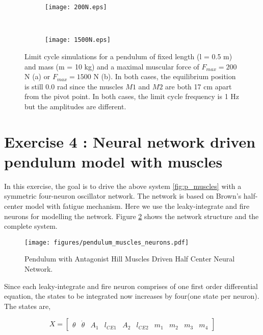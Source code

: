 \documentclass{cmc}
\begin{document}
\begin{figure}[h!]
    \centering
    \begin{subfigure}[t]{0.5\textwidth}
        \centering
        \texttt{[image: 200N.eps]}
        \caption{}
    \end{subfigure}%
    ~ 
    \begin{subfigure}[t]{0.5\textwidth}
        \centering
        \texttt{[image: 1500N.eps]}
        \caption{}
    \end{subfigure}
    \caption{ Limit cycle simulations for a pendulum of fixed length (l = 0.5 m) and mass  (m = 10 kg) and a maximal muscular force of  $F_{max} = 200$ N (a) or $F_{max} = 1500$ N (b). In both cases, the equilibrium position is still 0.0 rad since the muscles $M1$ and $M2$ are both 17 cm apart from the pivot point. In both cases, the limit cycle frequency is 1 Hz but the amplitudes are different.}
    \label{figure:3f}
\end{figure}

\newpage
\section*{Exercise 4 : Neural network driven pendulum model with
  muscles}
\label{sec:neur-netw-driv}

In this exercise, the goal is to drive the above system
\ref{fig:p_muscles} with a symmetric four-neuron oscillator
network. The network is based on Brown's half-center model with
fatigue mechanism. Here we use the leaky-integrate and fire neurons
for modelling the network. Figure \ref{fig:p_muscles_neurons} shows
the network structure and the complete system.

\begin{figure}[H]
  \centering
  \texttt{[image: figures/pendulum\_muscles\_neurons.pdf]}
  \caption{Pendulum with Antagonist Hill Muscles Driven Half Center
    Neural Network.}
  \label{fig:p_muscles_neurons}
\end{figure}

Since each leaky-integrate and fire neuron comprises of one first
order differential equation, the states to be integrated now increases
by four(one state per neuron). The states are,


\begin{equation}
  \label{eq:1}
  X = \begin{bmatrix}
    \theta & \dot{\theta} & A_1 & l_{CE1} & A_2 & l_{CE2} & m_1 & m_2 & m_3 & m_4
  \end{bmatrix}
\end{equation}
\end{document}
